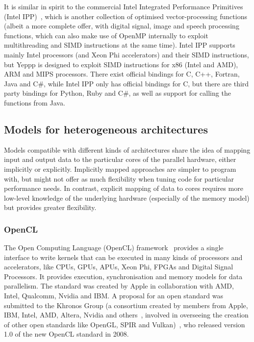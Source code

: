 It is similar in spirit to the commercial Intel Integrated Performance Primitives (Intel IPP)~\cite{5_software.intel.com_2015}, which is another collection of optimised vector-processing functions (albeit a more complete offer, with digital signal, image and speech processing functions, which can also make use of OpenMP internally to exploit multithreading and SIMD instructions at the same time). Intel IPP supports mainly Intel processors (and Xeon Phi accelerators) and their SIMD instructions, but Yeppp is designed to exploit SIMD instructions for x86 (Intel and AMD), ARM and MIPS processors. There exist official bindings for C, C++, Fortran, Java and C\#, while Intel IPP only has official bindings for C, but there are third party bindings for Python, Ruby and C\#, as well as support for calling the functions from Java.



\subsection{Models for heterogeneous architectures}

Models compatible with different kinds of architectures share the idea of mapping input and output data to the particular cores of the parallel hardware, either implicitly or explicitly. Implicitly mapped approaches are simpler to program with, but might not offer as much flexibility when tuning code for particular performance needs. In contrast, explicit mapping of data to cores requires more low-level knowledge of the underlying hardware (especially of the memory model) but provides greater flexibility.

\subsubsection{OpenCL}

The Open Computing Language (OpenCL) framework~\cite{stone2010opencl} provides a single interface to write kernels that can be executed in many kinds of processors and accelerators, like CPUs, GPUs, APUs, Xeon Phi, FPGAs and Digital Signal Processors. It provides execution, synchronisation and memory models for data parallelism. The standard was created by Apple in collaboration with AMD, Intel, Qualcomm, Nvidia and IBM. A proposal for an open standard was submitted to the Khronos Group (a consortium created by members from Apple, IBM, Intel, AMD, Altera, Nvidia and others~\cite{6_wikipedia_2015}, involved in overseeing the creation of other open standards like OpenGL, SPIR and Vulkan)~\cite{11_khronos.org_2015}, who released version 1.0 of the new OpenCL standard in 2008.


